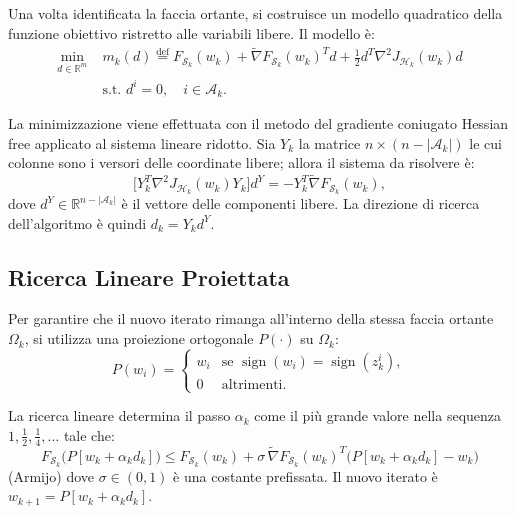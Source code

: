 \documentclass[italian, a4paper, twoside, binding=6mm]{sapthesis}
\begin{document}
Una volta identificata la faccia ortante, si costruisce un modello quadratico
della funzione obiettivo ristretto alle variabili libere. Il modello è:
\begin{equation}
\begin{aligned}
\min_{d \in \mathbb{R}^m} \;& m_k(d) \stackrel{\mathrm{def}}{=}
F_{\mathcal{S}_k}(w_k) + \widetilde{\nabla}F_{\mathcal{S}_k}(w_k)^T d
+ \frac{1}{2} d^T \nabla^2 J_{\mathcal{H}_k}(w_k) d \\
& \text{s.t. } d^i = 0, \quad i \in \mathcal{A}_k.
\end{aligned} \tag{5.47}
\end{equation}

La minimizzazione viene effettuata con il metodo del gradiente coniugato
Hessian free applicato al sistema lineare ridotto. Sia $Y_k$ la matrice
$n \times (n - |\mathcal{A}_k|)$ le cui colonne sono i versori delle coordinate
libere; allora il sistema da risolvere è:
\begin{equation}
\bigl[ Y_k^T \nabla^2 J_{\mathcal{H}_k}(w_k) Y_k \bigr] d^Y
= -Y_k^T \widetilde{\nabla}F_{\mathcal{S}_k}(w_k), \tag{5.48}
\end{equation}
dove $d^Y \in \mathbb{R}^{n-|\mathcal{A}_k|}$ è il vettore delle componenti libere.
La direzione di ricerca dell'algoritmo è quindi $d_k = Y_k d^Y$.

\subsection{Ricerca Lineare Proiettata}

Per garantire che il nuovo iterato rimanga all'interno della stessa faccia
ortante $\Omega_k$, si utilizza una proiezione ortogonale $P(\cdot)$
su $\Omega_k$:
\begin{equation}
P(w_i) =
\begin{cases}
w_i & \text{se } \operatorname{sign}(w_i) = \operatorname{sign}(z_k^i), \\[4pt]
0   & \text{altrimenti}.
\end{cases} \tag{5.49}
\end{equation}

La ricerca lineare determina il passo $\alpha_k$ come il più grande valore
nella sequenza $1, \frac{1}{2}, \frac{1}{4}, \dots$ tale che:
\begin{equation}
F_{\mathcal{S}_k}\bigl(P[w_k + \alpha_k d_k]\bigr)
\le F_{\mathcal{S}_k}(w_k)
+ \sigma \, \widetilde{\nabla}F_{\mathcal{S}_k}(w_k)^T
\bigl(P[w_k + \alpha_k d_k] - w_k\bigr)\tag{5.50}
\end{equation}
(Armijo)
dove $\sigma \in (0,1)$ è una costante prefissata. Il nuovo iterato è
$w_{k+1} = P[w_k + \alpha_k d_k]$.
\end{document}
